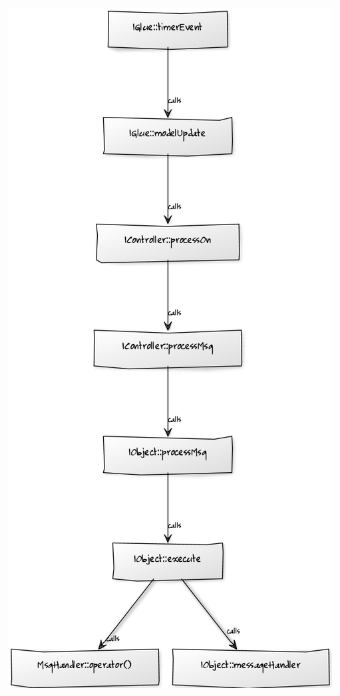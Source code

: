 \documentclass[a4paper]{article}
\begin{document}
\begin{figure}[h]
\hspace{-3cm}
\includegraphics[height=18cm]{img/schema1.png}

\end{figure}
\end{document}
